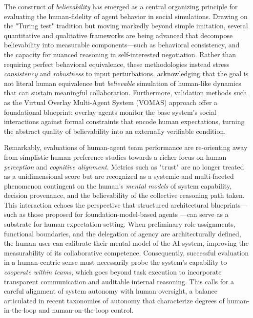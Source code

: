 \documentclass[11pt,a4paper]{article}
\begin{document}
The construct of \emph{believability} has emerged as a central organizing principle for evaluating the human-fidelity of agent behavior in social simulations. Drawing on the "Turing test" tradition but moving markedly beyond simple imitation, several quantitative and qualitative frameworks are being advanced that decompose believability into measurable components---such as behavioral consistency, and the capacity for nuanced reasoning in self-interested negotiation. Rather than requiring perfect behavioral equivalence, these methodologies instead stress \emph{consistency} and \emph{robustness} to input perturbations, acknowledging that the goal is not literal human equivalence but \emph{believable} simulation of human-like dynamics that can sustain meaningful collaboration. Furthermore, validation methods such as the Virtual Overlay Multi-Agent System (VOMAS) approach \cite{arxiv:1708.02361v1} offer a foundational blueprint: overlay agents monitor the base system's social interactions against formal constraints that encode human expectations, turning the abstract quality of believability into an externally verifiable condition.

Remarkably, evaluations of human-agent team performance are re-orienting away from simplistic human preference studies towards a richer focus on human \emph{perception} and \emph{cognitive alignment}. Metrics such as "trust" are no longer treated as a unidimensional score but are recognized as a systemic and multi-faceted phenomenon contingent on the human's \emph{mental models} of system capability, decision provenance, and the believability of the collective reasoning path taken. This interaction echoes the perspective that structured architectural blueprints---such as those proposed for foundation-model-based agents \cite{arxiv:2311.13148v3}---can serve as a substrate for human expectation-setting. When preliminary role assignments, functional boundaries, and the delegation of agency are architecturally defined, the human user can calibrate their mental model of the AI system, improving the measurability of its collaborative competence. Consequently, successful evaluation in a human-centric sense must necessarily probe the system's capability to \emph{cooperate within teams}, which goes beyond task execution to incorporate transparent communication and auditable internal reasoning. This calls for a careful alignment of system autonomy with human oversight, a balance articulated in recent taxonomies of autonomy \cite{arxiv:2310.03659v1} that characterize degrees of human-in-the-loop and human-on-the-loop control.
\end{document}
